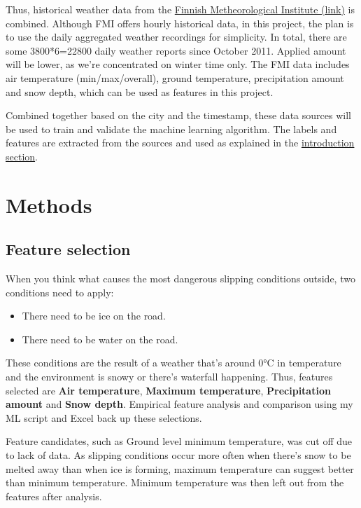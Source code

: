 \documentclass[12pt, a4paper]{report}
\begin{document}
    Thus, historical weather data from the \href{https://en.ilmatieteenlaitos.fi/download-observations}{Finnish Metheorological Institute (link)}
    is combined. Although FMI offers hourly historical data, in this project, the plan is to use the daily aggregated weather recordings for simplicity.
    In total, there are some 3800*6=22800 daily weather reports since October 2011. Applied amount will be lower, as we're concentrated on winter time only.
    The FMI data includes air temperature (min/max/overall), ground temperature, precipitation amount and snow depth, which can be used as features in this project.

    Combined together based on the city and the timestamp, these data sources will be used to train and validate the machine learning algorithm. The labels and features are extracted from the sources and used as explained in the \hyperlink{section.0.1.1}{introduction section}.

    \section{Methods}
    \subsection{Feature selection}
    When you think what causes the most dangerous slipping conditions outside, two conditions need to apply:
    \begin{itemize}
      \item There need to be ice on the road.
      \item There need to be water on the road.
    \end{itemize}
    These conditions are the result of a weather that's around 0°C in temperature and the environment is snowy or there's waterfall happening.
    Thus, features selected are \textbf{Air temperature}, \textbf{Maximum temperature}, \textbf{Precipitation amount} and \textbf{Snow depth}. Empirical feature analysis 
    and comparison using my ML script and Excel back up these selections. 

    Feature candidates, such as Ground level minimum temperature, was cut off due to lack of data.
    As slipping conditions occur more often when there's snow to be melted away than when ice is forming, maximum temperature can
    suggest better than minimum temperature. Minimum temperature was then left out from the features after analysis.
\end{document}
